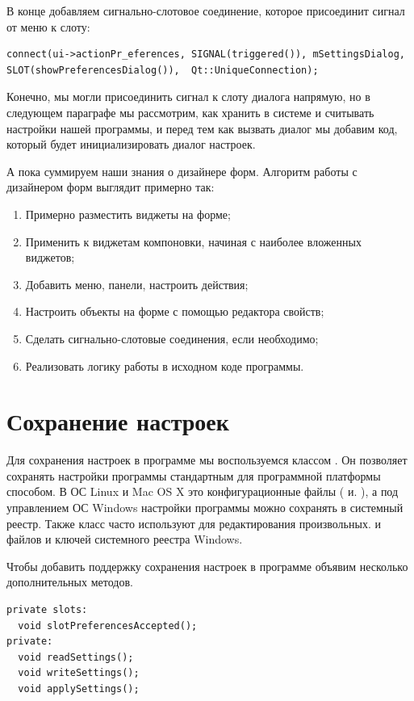 В конце добавляем сигнально-слотовое соединение, которое присоединит сигнал от меню к слоту: 

\begin{lstlisting}
connect(ui->actionPr_eferences, SIGNAL(triggered()), mSettingsDialog, SLOT(showPreferencesDialog()),  Qt::UniqueConnection);
\end{lstlisting}

Конечно, мы могли присоединить сигнал к слоту  диалога напрямую, но в следующем параграфе мы
рассмотрим, как хранить в системе и считывать настройки нашей программы, и перед тем как вызвать диалог мы добавим код,
который будет инициализировать диалог настроек. 

А пока суммируем наши знания о дизайнере форм. Алгоритм работы с дизайнером форм выглядит примерно так:

\begin{enumerate}
\item Примерно разместить виджеты на форме;
\item Применить к виджетам компоновки, начиная с наиболее вложенных виджетов;
\item Добавить меню, панели, настроить действия;
\item Настроить объекты на форме с помощью редактора свойств;
\item Сделать сигнально-слотовые соединения, если необходимо;
\item Реализовать логику работы в исходном коде программы. 
\end{enumerate}

\section[Сохранение настроек]{Сохранение настроек}
Для сохранения настроек в программе мы воспользуемся классом . Он позволяет сохранять настройки
программы стандартным для программной платформы способом. В ОС Linux и Mac OS X это конфигурационные файлы
( и. ), а под
управлением ОС Windows настройки программы можно сохранять в системный реестр. Также класс
 часто используют для редактирования произвольных.
 и  файлов и ключей системного реестра
Windows.

Чтобы добавить поддержку сохранения настроек в программе объявим несколько дополнительных методов. 
\begin{lstlisting}
private slots:
  void slotPreferencesAccepted();
private:
  void readSettings();
  void writeSettings();
  void applySettings();
\end{lstlisting}

